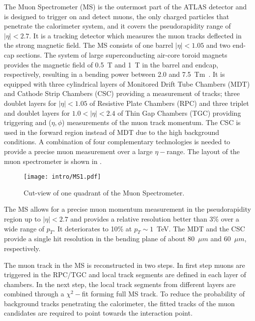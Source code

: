 The Muon Spectrometer (MS) is the outermost part of the ATLAS detector and is designed to trigger on and detect muons, the only charged particles that penetrate the calorimeter system, and it covers the pseudorapidity range of $|\eta|<2.7$. It is a tracking detector which measures the muon tracks deflected in the strong magnetic field. The MS consists of one barrel $|\eta|<1.05$ and two end-cap sections. The system of large superconducting air-core toroid magnets provides the magnetic field of 0.5~T and 1~T in the barrel and endcap, respectively, resulting in a bending power between 2.0 and 7.5~Tm~\cite{MCPrun1}. It is equipped with three cylindrical layers of Monitored Drift Tube Chambers (MDT) and Cathode Strip Chambers (CSC) providing a measurement of tracks; three doublet layers for $|\eta|<1.05$ of Resistive Plate Chambers (RPC) and three triplet and doublet layers for $1.0 < |\eta| < 2.4$ of Thin Gap Chambers (TGC) providing triggering and ($\eta, \phi$) measurements of the muon track momentum.
The CSC is used in the forward region instead of MDT due to the high background conditions.
A combination of four complementary technologies is needed to provide a precise muon measurement over a large $\eta-$range. The layout of the muon spectrometer is shown in .

\begin{figure}[h!]
\centering
 \texttt{[image: intro/MS1.pdf]}
 \caption{Cut-view of one quadrant of the Muon Spectrometer.}
\label{fig:MS}
\end{figure}

The MS allows for a precise muon momentum measurement in the pseudorapidity region up to 
$|\eta|<2.7$ and provides a relative resolution better than 3\% over a wide range of $p_T$. It deteriorates to 10\% at $p_T\sim 1$~TeV.
The MDT and the CSC provide a single hit resolution in the bending plane of about 80~$\mu m$ and 60~$\mu m$, respectively.

The muon track in the MS is reconstructed in two steps. In first step muons are triggered in the RPC/TGC and local track segments are defined in each layer of chambers. In the next step, the local track segments from different layers are combined through a $\chi^2-$fit forming full MS track. To reduce the probability of background tracks penetrating the calorimeter, the fitted tracks of the muon candidates are required to point towards the interaction point.

